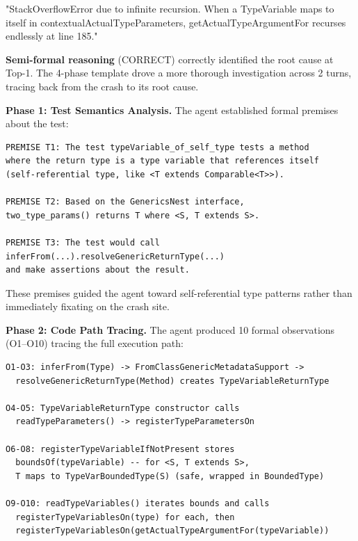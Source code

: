 \documentclass[]{meta}
\begin{document}
"StackOverflowError due to infinite recursion. When a TypeVariable maps to itself in contextualActualTypeParameters, getActualTypeArgumentFor recurses endlessly at line 185."

\textbf{Semi-formal reasoning} (CORRECT) correctly identified the root cause at Top-1. The 4-phase template drove a more thorough investigation across 2 turns, tracing back from the crash to its root cause.

\textbf{Phase 1: Test Semantics Analysis.} The agent established formal premises about the test:

\begin{tcolorbox}[colback=gray!5, colframe=gray!50, boxrule=0.3pt, breakable]
\small
\begin{verbatim}
PREMISE T1: The test typeVariable_of_self_type tests a method
where the return type is a type variable that references itself
(self-referential type, like <T extends Comparable<T>>).

PREMISE T2: Based on the GenericsNest interface,
two_type_params() returns T where <S, T extends S>.

PREMISE T3: The test would call
inferFrom(...).resolveGenericReturnType(...)
and make assertions about the result.
\end{verbatim}
\end{tcolorbox}

These premises guided the agent toward self-referential type patterns rather than immediately fixating on the crash site.

\textbf{Phase 2: Code Path Tracing.} The agent produced 10 formal observations (O1--O10) tracing the full execution path:

\begin{tcolorbox}[colback=gray!5, colframe=gray!50, boxrule=0.3pt, breakable]
\small
\begin{verbatim}
O1-O3: inferFrom(Type) -> FromClassGenericMetadataSupport ->
  resolveGenericReturnType(Method) creates TypeVariableReturnType

O4-O5: TypeVariableReturnType constructor calls
  readTypeParameters() -> registerTypeParametersOn

O6-O8: registerTypeVariableIfNotPresent stores
  boundsOf(typeVariable) -- for <S, T extends S>,
  T maps to TypeVarBoundedType(S) (safe, wrapped in BoundedType)

O9-O10: readTypeVariables() iterates bounds and calls
  registerTypeVariablesOn(type) for each, then
  registerTypeVariablesOn(getActualTypeArgumentFor(typeVariable))
\end{verbatim}
\end{tcolorbox}
\end{document}
